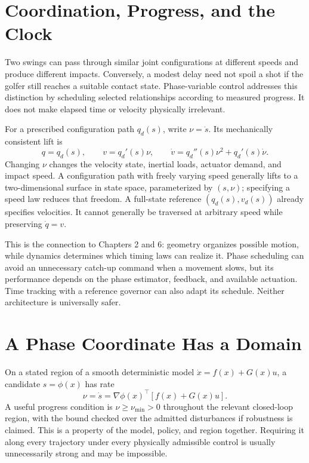 \documentclass[12pt, openany]{book}
\theoremstyle{plain}
\begin{document}
\section{Coordination, Progress, and the Clock}

Two swings can pass through similar joint configurations at different speeds and produce different impacts. Conversely, a modest delay need not spoil a shot if the golfer still reaches a suitable contact state. Phase-variable control addresses this distinction by scheduling selected relationships according to measured progress. It does not make elapsed time or velocity physically irrelevant.

For a prescribed configuration path $q_d(s)$, write $\nu=\dot s$. Its mechanically consistent lift is
\begin{equation}
q=q_d(s),\qquad v=q_d'(s)\nu,\qquad
\dot v=q_d''(s)\nu^2+q_d'(s)\dot\nu .
\end{equation}
Changing $\nu$ changes the velocity state, inertial loads, actuator demand, and impact speed. A configuration path with freely varying speed generally lifts to a two-dimensional surface in state space, parameterized by $(s,\nu)$; specifying a speed law reduces that freedom. A full-state reference $(q_d(s),v_d(s))$ already specifies velocities. It cannot generally be traversed at arbitrary speed while preserving $\dot q=v$.

This is the connection to Chapters 2 and 6: geometry organizes possible motion, while dynamics determines which timing laws can realize it. Phase scheduling can avoid an unnecessary catch-up command when a movement slows, but its performance depends on the phase estimator, feedback, and available actuation. Time tracking with a reference governor can also adapt its schedule. Neither architecture is universally safer.

\section{A Phase Coordinate Has a Domain}

On a stated region of a smooth deterministic model $\dot x=f(x)+G(x)u$, a candidate $s=\phi(x)$ has rate
\begin{equation}
\nu=\dot s=\nabla\phi(x)^\top[f(x)+G(x)u].
\end{equation}
A useful progress condition is $\nu\geq\nu_{\min}>0$ throughout the relevant closed-loop region, with the bound checked over the admitted disturbances if robustness is claimed. This is a property of the model, policy, and region together. Requiring it along every trajectory under every physically admissible control is usually unnecessarily strong and may be impossible.
\end{document}
